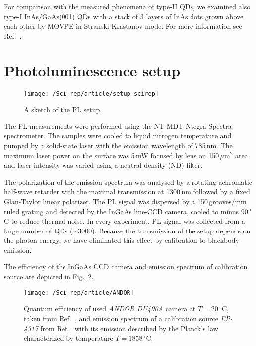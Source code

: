 For comparison with the measured phenomena of type-II QDs, we examined also type-I InAs/GaAs(001) QDs with a stack of 3 layers of InAs dots grown above each other by MOVPE in Stranski-Krastanov mode. For more information see Ref.~\citep{HumPhysE}.

\section{Photoluminescence setup}
%
\begin{figure}
	\centering
	\texttt{[image: /Sci\_rep/article/setup\_scirep]}
	\caption{A sketch of the PL setup.}
	\label{fig:}
\end{figure}
The PL measurements were performed using the NT-MDT Ntegra-Spectra spectrometer. The samples were cooled to liquid nitrogen temperature and pumped by a solid-state laser with the emission wavelength of 785$\,$nm. The maximum laser power on the surface was 5$\,$mW focused by lens on 150$\,$$\mu\mathrm{m}^2$ area and laser intensity was varied using a neutral density (ND) filter. 

%
The polarization of the emission spectrum was analysed by a rotating achromatic half-wave retarder with the maximal transmission at 1300$\,$nm followed by a fixed Glan-Taylor linear polarizer. The PL signal was dispersed by a 150$\,$grooves/mm ruled grating and detected by the InGaAs line-CCD camera, cooled to minus 90$\,$$^\circ$C to reduce thermal noise. In every experiment, PL signal was collected from a large number of QDs ($\sim 3000$). Because the transmission of the setup depends on the photon energy, we have eliminated this effect by calibration to blackbody emission. 


The efficiency of the InGaAs CCD camera and emission spectrum of calibration source are depicted in Fig.~\ref{fig:calib_scirep}.
\begin{figure}
	\centering
	\texttt{[image: /Sci\_rep/article/ANDOR]}
	\caption{Quantum efficiency of used \textit{ANDOR DU490A} camera at $T=20\,^\circ$C, taken from Ref.~\citep{manual_andor}, and emission spectrum of a calibration source \textit{EP-4317} from Ref.~\citep{manual_BB} with its emission described by the Planck's law~\citep{Planck_law} characterized by temperature $T=1858\,^\circ$C.}
	\label{fig:calib_scirep}
\end{figure}

